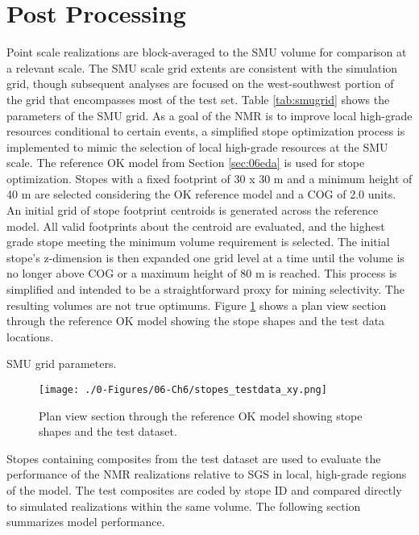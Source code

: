 \FloatBarrier
\section{Post Processing}
\label{sec:06post}

Point scale realizations are block-averaged to the \gls{SMU} volume for comparison at a relevant scale. The \gls{SMU} scale grid extents are consistent with the simulation grid, though subsequent analyses are focused on the west-southwest portion of the grid that encompasses most of the test set. Table \ref{tab:smugrid} shows the parameters of the \gls{SMU} grid. As a goal of the \gls{NMR} is to improve local high-grade resources conditional to certain events, a simplified stope optimization process is implemented to mimic the selection of local high-grade resources at the \gls{SMU} scale. The reference \gls{OK} model from Section \ref{sec:06eda} is used for stope optimization. Stopes with a fixed footprint of 30 x 30 m and a minimum height of 40 m are selected considering the \gls{OK} reference model and a \gls{COG} of 2.0 units. An initial grid of stope footprint centroids is generated across the reference model. All valid footprints about the centroid are evaluated, and the highest grade stope meeting the minimum volume requirement is selected. The initial stope's z-dimension is then expanded one grid level at a time until the volume is no longer above \gls{COG} or a maximum height of 80 m is reached. This process is simplified and intended to be a straightforward proxy for mining selectivity. The resulting volumes are not true optimums. Figure \ref{fig:stopes_testdata_xy} shows a plan view section through the reference \gls{OK} model showing the stope shapes and the test data locations.

\begin{table}[!htb]
    \centering
    \caption{\Gls{SMU} grid parameters.}
    \resizebox{0.9\width}{!}{}
    \label{tab:smugrid}
\end{table}

\begin{figure}[htb!]
    \centering
    \texttt{[image: ./0-Figures/06-Ch6/stopes\_testdata\_xy.png]}
    \caption{Plan view section through the reference \gls{OK} model showing stope shapes and the test dataset. }
    \label{fig:stopes_testdata_xy}
\end{figure}

Stopes containing composites from the test dataset are used to evaluate the performance of the \gls{NMR} realizations relative to \gls{SGS} in local, high-grade regions of the model. The test composites are coded by stope ID and compared directly to simulated realizations within the same volume. The following section summarizes model performance.

